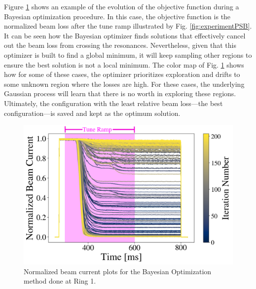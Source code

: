 Figure \ref{fig:ibo} shows an example of the evolution of the objective function during a Bayesian optimization procedure. In this case, the objective function is the normalized beam loss after the tune ramp illustrated by Fig. \ref{fig:experimentPSB}. It can be seen how the Bayesian optimizer finds solutions that effectively cancel out the beam loss from crossing the resonances. Nevertheless, given that this optimizer is built to find a global minimum, it will keep sampling other regions to ensure the best solution is not a local minimum. The color map of Fig. \ref{fig:ibo} shows how for some of these cases, the optimizer prioritizes exploration and drifts to some unknown region where the losses are high. For these cases, the underlying Gaussian process will learn that there is no worth in exploring these regions. Ultimately, the configuration with the least relative beam loss---the best configuration---is saved and kept as the optimum solution.

\begin{figure}[H]
    \centering
    \includegraphics[width=\linewidth]{chapter5/i1_bo_commented.png}
    \caption{Normalized beam current plots for the Bayesian Optimization method done at Ring 1.}
    \label{fig:ibo}
   \vspace{-1.25em}
\end{figure}

